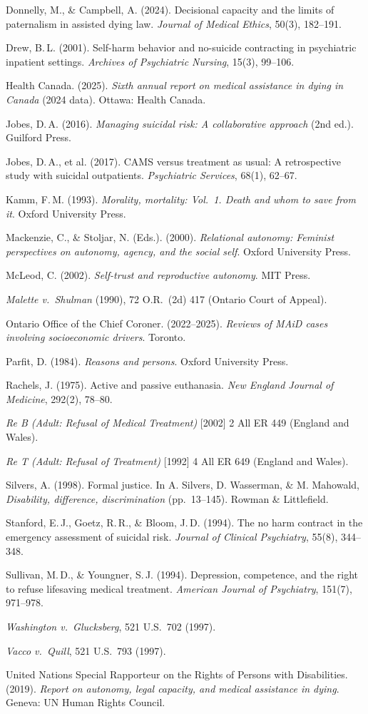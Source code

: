 \documentclass[11pt, letterpaper]{article}
\begin{document}
Donnelly, M., \& Campbell, A. (2024). Decisional capacity and the limits of
paternalism in assisted dying law. \textit{Journal of Medical Ethics}, 50(3), 182--191.

Drew, B.\,L. (2001). Self-harm behavior and no-suicide contracting in psychiatric
inpatient settings. \textit{Archives of Psychiatric Nursing}, 15(3), 99--106.

Health Canada. (2025). \textit{Sixth annual report on medical assistance in dying in
Canada} (2024 data). Ottawa: Health Canada.

Jobes, D.\,A. (2016). \textit{Managing suicidal risk: A collaborative approach}
(2nd ed.). Guilford Press.

Jobes, D.\,A., et al. (2017). CAMS versus treatment as usual: A retrospective study with
suicidal outpatients. \textit{Psychiatric Services}, 68(1), 62--67.

Kamm, F.\,M. (1993). \textit{Morality, mortality: Vol.~1. Death and whom to save from it}.
Oxford University Press.

Mackenzie, C., \& Stoljar, N. (Eds.). (2000). \textit{Relational autonomy: Feminist
perspectives on autonomy, agency, and the social self}. Oxford University Press.

McLeod, C. (2002). \textit{Self-trust and reproductive autonomy}. MIT Press.

\textit{Malette v.\ Shulman} (1990), 72 O.R.\ (2d) 417 (Ontario Court of Appeal).

Ontario Office of the Chief Coroner. (2022--2025).
\textit{Reviews of MAiD cases involving socioeconomic drivers}. Toronto.

Parfit, D. (1984). \textit{Reasons and persons}. Oxford University Press.

Rachels, J. (1975). Active and passive euthanasia.
\textit{New England Journal of Medicine}, 292(2), 78--80.

\textit{Re B (Adult: Refusal of Medical Treatment)} [2002] 2 All ER 449 (England and Wales).

\textit{Re T (Adult: Refusal of Treatment)} [1992] 4 All ER 649 (England and Wales).

Silvers, A. (1998). Formal justice. In A. Silvers, D. Wasserman, \& M. Mahowald,
\textit{Disability, difference, discrimination} (pp.\ 13--145). Rowman \& Littlefield.

Stanford, E.\,J., Goetz, R.\,R., \& Bloom, J.\,D. (1994). The no harm contract in the
emergency assessment of suicidal risk. \textit{Journal of Clinical Psychiatry},
55(8), 344--348.

Sullivan, M.\,D., \& Youngner, S.\,J. (1994). Depression, competence, and the right to
refuse lifesaving medical treatment. \textit{American Journal of Psychiatry},
151(7), 971--978.

\textit{Washington v.\ Glucksberg}, 521 U.S.\ 702 (1997).

\textit{Vacco v.\ Quill}, 521 U.S.\ 793 (1997).

United Nations Special Rapporteur on the Rights of Persons with Disabilities. (2019).
\textit{Report on autonomy, legal capacity, and medical assistance in dying}.
Geneva: UN Human Rights Council.
\end{document}
